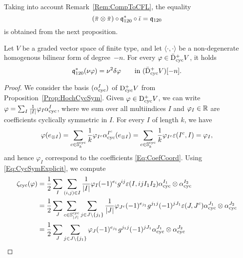 \documentclass[\MainFolder/Text.tex]{subfiles}
\begin{document}
Taking into account Remark~\ref{Rem:CompToCFL}, the equality
$$ (\bar{\pi}\otimes\bar{\pi})\circ\mathfrak{q}_{120}^*\circ\bar{\iota} = \mathfrak{q}_{120} $$
is obtained from the next proposition.
\begin{Proposition}\label{Prop:EqCoprod}
Let $V$ be a graded vector space of finite type, and let $\langle\cdot,\cdot\rangle$ be a non-degenerate homogenous bilinear form of degree~$-n$. For every $\varphi\in \bar{\mathrm{D}}^+_{\mathrm{cyc}} V$, it holds
$$ \mathfrak{q}_{120}^*(\nu \varphi) = \nu^2 \delta \varphi\qquad\text{in }(\bar{\mathrm{D}}^+_{\mathrm{cyc}} V)[-n]. $$
\end{Proposition}
\begin{proof}
We consider the basis $(\alpha^I_{\mathrm{cyc}})$ of $\mathrm{D}^+_{\mathrm{cyc}} V$ from Proposition~\ref{Prop:HochCycSym}. Given $\varphi\in\mathrm{D}^+_{\mathrm{cyc}} V$, we can write $\varphi=\sum_{I}\frac{1}{|I|}\varphi_I\alpha^I_{\mathrm{cyc}}$, where we sum over all multiindices $I$ and $\varphi_I\in \mathbb{R}$ are coefficients cyclically symmetric in $I$. For every $I$ of length $k$, we have
$$ \varphi(e_{\otimes I}) = \sum_{c\in \mathbb{S}^{\mathrm{cyc}}_k}\frac{1}{k}\varphi_{I^c} \alpha^{I^c}_{\mathrm{cyc}}(e_{\otimes I}) = \sum_{c\in\mathbb{S}^{\mathrm{cyc}}_k}\frac{1}{k}\varphi_{I^c} \varepsilon(I^c,I) = \varphi_I, $$
and hence $\varphi_I$ correspond to the coefficients \eqref{Eq:CoefCoord}. Using \eqref{Eq:CycSymExplicit}, we compute
\begin{align*}
 \CoProdCyc(\varphi)&= \frac{1}{2}\sum_I \sum_{(i,j)\in I} \frac{1}{\Abs{I}}\varphi_I  (-1)^{e_i} g^{ij}\varepsilon(I,i j I_1 I_2) \alpha^{I_1}_{\CycMRM} \otimes \alpha^{I_2}_{\CycMRM} \\
 &=\frac{1}{2}\sum_J \sum_{c\in \CycPerm_{\Abs{J}}} \sum_{j \in J\backslash\{j_1\}} \frac{1}{\Abs{J}}\varphi_{J^c} (-1)^{e_{j_1}} g^{{j_1} j}(-1)^{j J_1}\varepsilon(J,J^c) \alpha^{J_1}_{\CycMRM} \otimes \alpha^{J_2}_{\CycMRM} \\
 &=\frac{1}{2}\sum_J\sum_{j\in J\backslash\{j_1\}} \varphi_J(-1)^{e_{j_1}}g^{j_1 j}(-1)^{j J_1} \alpha_{\CycMRM}^{J_1}\otimes \alpha_{\CycMRM}^{J_2}  \\

\end{align*}
\end{proof}
\end{document}
